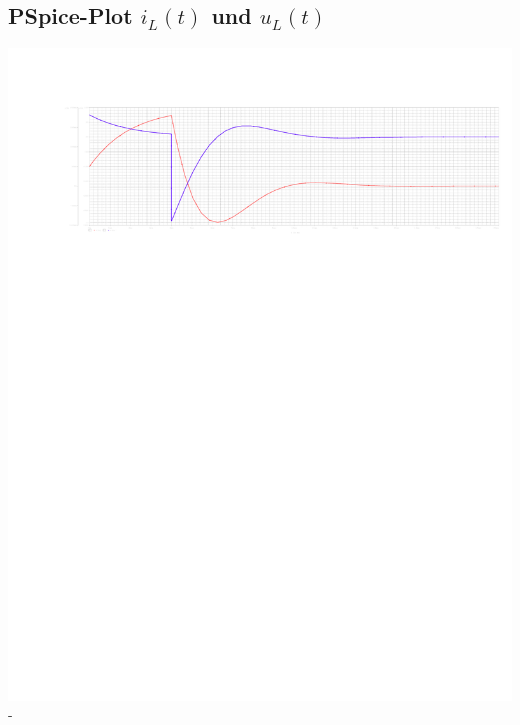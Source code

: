 \documentclass[11pt]{scrartcl}
\begin{document}
\subsection{PSpice-Plot $i_L(t)$ und $u_L(t)$} %


  \hspace{-2cm}
  \includegraphics[width=1.25\linewidth]{./Assets/PS_doppel_plot.pdf}
  \label{fig:ML_Strom_Plot}
-
\end{document}
